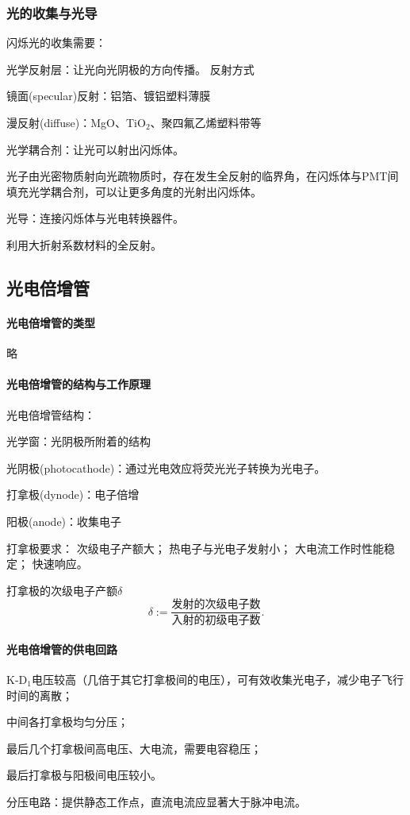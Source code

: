 \subsubsection{光的收集与光导}
闪烁光的收集需要：
\begin{compactitem}
	\item 光学反射层：让光向光阴极的方向传播。
	反射方式
	\begin{compactitem}
		\item 镜面(specular)反射：铝箔、镀铝塑料薄膜
		\item 漫反射(diffuse)：MgO、TiO$_2$、聚四氟乙烯塑料带等
	\end{compactitem}
	\item 光学耦合剂：让光可以射出闪烁体。
	
	光子由光密物质射向光疏物质时，存在发生全反射的临界角，在闪烁体与PMT间填充光学耦合剂，可以让更多角度的光射出闪烁体。
	\item 光导：连接闪烁体与光电转换器件。
	
	利用大折射系数材料的全反射。
\end{compactitem}
\subsection{光电倍增管}
\paragraph{光电倍增管的类型}略
\paragraph{光电倍增管的结构与工作原理}
光电倍增管结构：
\begin{compactenum}
	\item 光学窗：光阴极所附着的结构
	\item 光阴极(photocathode)：通过光电效应将荧光光子转换为光电子。%
	\item 打拿极(dynode)：电子倍增
	\item 阳极(anode)：收集电子
\end{compactenum}

打拿极要求：
次级电子产额大；
热电子与光电子发射小；
大电流工作时性能稳定；
快速响应。

打拿极的次级电子产额$\delta$
\[
	\delta:=\frac{\text{发射的次级电子数}}{\text{入射的初级电子数}}.
\]

\paragraph{光电倍增管的供电回路}
\begin{compactenum}
	\item K-D$_1$电压较高（几倍于其它打拿极间的电压），可有效收集光电子，减少电子飞行时间的离散；
	\item 中间各打拿极均匀分压；
	\item 最后几个打拿极间高电压、大电流，需要电容稳压；
	\item 最后打拿极与阳极间电压较小。
\end{compactenum}
分压电路：提供静态工作点，直流电流应显著大于脉冲电流。

